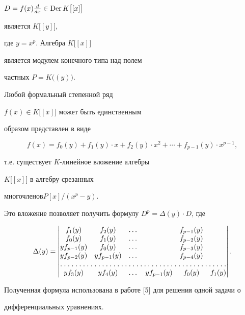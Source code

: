 $D=f(x)\frac{d}{dx}\in\operatorname{Der} K\bigl[[x]\bigr]$ 


является $K\bigl[[y]\bigr]$, 


где $y=x^p$. Алгебра $K\bigl[[x]\bigr]$ 


является модулем конечного типа над полем 


частных $P=K\bigl((y)\bigr)$. 


Любой формальный степенной ряд 


$f(x)\in K\bigl[[x]\bigr]$ может быть единственным 


образом представлен в виде 


$$ 


f(x)=f_0(y)+f_1(y)\cdot x+f_2(y)\cdot x^2+\dotsb+ 


f_{p-1}(y)\cdot x^{p-1}, 


$$ 


т.е. существует $K$-линейное вложение алгебры 


$K\bigl[[x]\bigr]$ в алгебру срезанных 


многочленов\linebreak $P[x]/(x^p-y)$. 


 


Это вложение позволяет получить формулу $D^p=\Delta(y)\cdot D$, где 


$$ 


\Delta(y)= 


\begin{vmatrix} 


f_1(y) & f_2(y) & \dots & & f_{p-1}(y)\\ 


f_0(y) & f_1(y) & \dots & & f_{p-2}(y)\\ 


yf_{p-1}(y) & f_0(y) & \dots & & f_{p-3}(y)\\ 


yf_{p-2}(y) & yf_{p-1}(y) & \dots & & f_{p-4}(y)\\ 


\hdotsfor[1.5]{6}\\ 


yf_3(y) & yf_4(y) & \dots & yf_{p-1}(y) & f_0(y) & f_1(y) 


\end{vmatrix} 


. 


$$ 


Полученная формула использована в работе [5] для решения одной задачи о 


дифференциальных уравнениях. 


